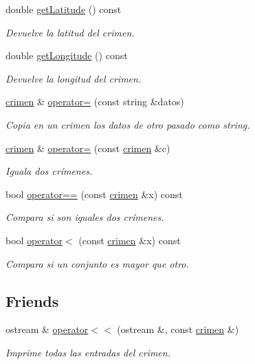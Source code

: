 \begin{DoxyCompactItemize}
double \hyperlink{classcrimen_adfd62cd48c7d1d0259c007d3f6c39d58}{get\+Latitude} () const 
\begin{DoxyCompactList}\small\item\em Devuelve la latitud del crimen. \end{DoxyCompactList}\item 
double \hyperlink{classcrimen_a0c24726cd34dc975b3fc7c664287a15c}{get\+Longitude} () const 
\begin{DoxyCompactList}\small\item\em Devuelve la longitud del crimen. \end{DoxyCompactList}\item 
\hyperlink{classcrimen}{crimen} \& \hyperlink{classcrimen_aaf1e77874a28ab1f2f5cd61efe386917}{operator=} (const string \&datos)
\begin{DoxyCompactList}\small\item\em Copia en un crimen los datos de otro pasado como string. \end{DoxyCompactList}\item 
\hyperlink{classcrimen}{crimen} \& \hyperlink{classcrimen_a612c4d3beaabd588703e4a580caf04e5}{operator=} (const \hyperlink{classcrimen}{crimen} \&c)
\begin{DoxyCompactList}\small\item\em Iguala dos crímenes. \end{DoxyCompactList}\item 
bool \hyperlink{classcrimen_aeced9ce4b7486123412975b8884d1ab7}{operator==} (const \hyperlink{classcrimen}{crimen} \&x) const 
\begin{DoxyCompactList}\small\item\em Compara si son iguales dos crímenes. \end{DoxyCompactList}\item 
bool \hyperlink{classcrimen_ac865fdb9712f2426d947b1b5546b50e5}{operator$<$} (const \hyperlink{classcrimen}{crimen} \&x) const 
\begin{DoxyCompactList}\small\item\em Compara si un conjunto es mayor que otro. \end{DoxyCompactList}\end{DoxyCompactItemize}
\subsection*{Friends}
\begin{DoxyCompactItemize}
\item 
ostream \& \hyperlink{classcrimen_a70d7dbf132d06cb3c889042765a7da2e}{operator$<$$<$} (ostream \&, const \hyperlink{classcrimen}{crimen} \&)
\begin{DoxyCompactList}\small\item\em Imprime todas las entradas del crimen. \end{DoxyCompactList}\end{DoxyCompactItemize}


